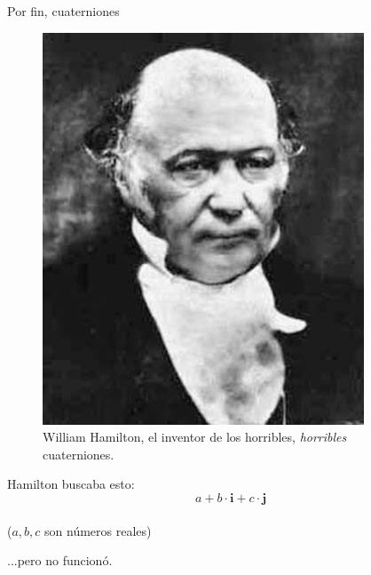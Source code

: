 \documentclass[10pt]{beamer}
\def\R{\mathbb{R}}
\begin{document}
\begin{frame}{Por fin, cuaterniones}

\begin{figure}  		
  	\centering
	\includegraphics[scale=0.35]{hamilton_cara.png}
	\caption*{William Hamilton, el inventor de los horribles, \textit{horribles} cuaterniones.}
\end{figure} 

	
	
Hamilton buscaba esto:
	$$a +b\cdot \textbf{i} + c \cdot \textbf{j}$$ \\
	
	($a,b,c$ son números reales) 
	
	...pero no funcionó.

\end{frame}
\end{document}
